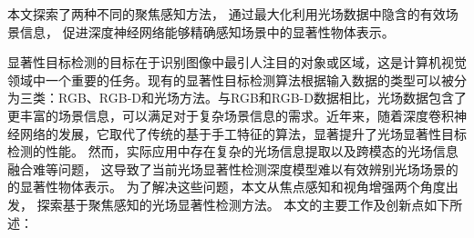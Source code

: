 

本文探索了两种不同的聚焦感知方法，
通过最大化利用光场数据中隐含的有效场景信息，
促进深度神经网络能够精确感知场景中的显著性物体表示。





%
%



显著性目标检测的目标在于识别图像中最引人注目的对象或区域，这是计算机视觉领域中一个重要的任务。现有的显著性目标检测算法根据输入数据的类型可以被分为三类：RGB、RGB-D和光场方法。与RGB和RGB-D数据相比，光场数据包含了更丰富的场景信息，可以满足对于复杂场景信息的需求。近年来，随着深度卷积神经网络的发展，它取代了传统的基于手工特征的算法，显著提升了光场显著性目标检测的性能。
%
%
%
%
然而，实际应用中存在复杂的光场信息提取以及跨模态的光场信息融合难等问题，
这导致了当前光场显著性检测深度模型难以有效辨别光场场景的的显著性物体表示。
%
%
为了解决这些问题，本文从焦点感知和视角增强两个角度出发，
探索基于聚焦感知的光场显著性检测方法。
本文的主要工作及创新点如下所述：









